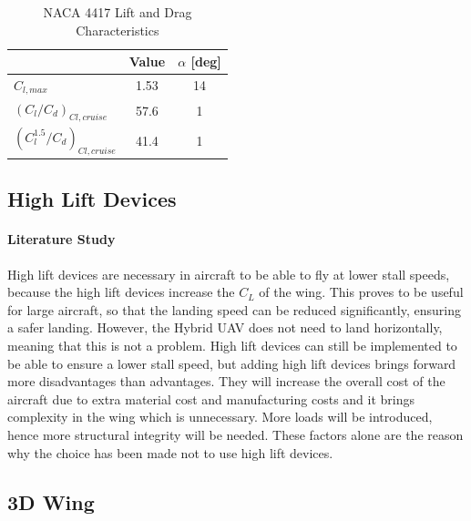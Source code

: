 

\begin{table}[H]
\centering
\caption{NACA 4417 Lift and Drag Characteristics}
\label{tab:naca4417}
\begin{tabular}{lcc}
\toprule
      & \textbf{Value} & \textbf{$\alpha$ {[}deg{]}} \\ \midrule
\textbf{$C_{l,max}$}    & 1.53  & 14                        \\ \hdashline
\textbf{$(C_{l}/C_{d})_{Cl,cruise}$} & 57.6  & 1                         \\ \hdashline
\textbf{$(C_{l}^{1.5}/C_{d})_{Cl,cruise}$} & 41.4  & 1                         \\ \bottomrule                                                                                
\end{tabular}
\end{table}

\subsection*{High Lift Devices}

\paragraph{Literature Study} High lift devices are necessary in aircraft to be able to fly at lower stall speeds, because the high lift devices increase the $C_{L}$ of the wing. This proves to be useful for large aircraft, so that the landing speed can be reduced significantly, ensuring a safer landing. However, the Hybrid UAV does not need to land horizontally, meaning that this is not a problem. High lift devices can still be implemented to be able to ensure a lower stall speed, but adding high lift devices brings forward more disadvantages than advantages. They will increase the overall cost of the aircraft due to extra material cost and manufacturing costs and it brings complexity in the wing which is unnecessary. More loads will be introduced, hence more structural integrity will be needed. These factors alone are the reason why the choice has been made not to use high lift devices.

\subsection*{3D Wing}

